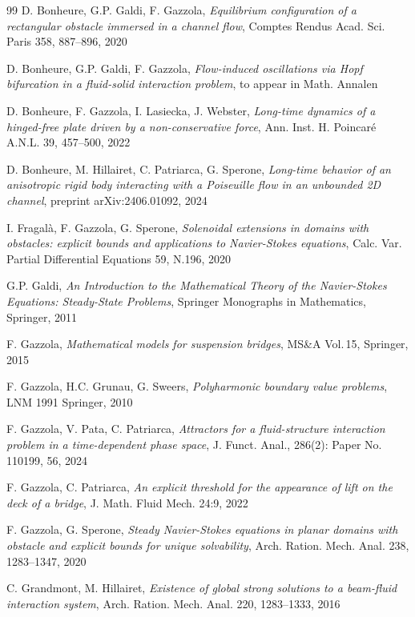 \documentclass[11pt,a4paper]{amsart}
\theoremstyle{remark}
\theoremstyle{definition}
\numberwithin{equation}{section}
\numberwithin{proposition}{section}
\begin{document}
{\begin{thebibliography}{99}
 D. Bonheure, G.P. Galdi, F. Gazzola, {\em Equilibrium configuration of a rectangular obstacle immersed in a channel flow}, Comptes Rendus Acad. Sci. Paris 358, 887--896, 2020

 D. Bonheure, G.P. Galdi, F. Gazzola, {\em Flow-induced oscillations via Hopf bifurcation in a fluid-solid interaction problem},
to appear in Math. Annalen

 D. Bonheure, F. Gazzola, I. Lasiecka, J. Webster, {\em Long-time dynamics of a hinged-free plate driven by a non-conservative force}, Ann. Inst. H. Poincar\'e A.N.L. 39, 457--500, 2022

 D. Bonheure, M. Hillairet, C. Patriarca, G. Sperone, {\em Long-time behavior of an anisotropic rigid body interacting with a Poiseuille flow in an unbounded 2D channel}, preprint arXiv:2406.01092, 2024



 I. Fragalà, F. Gazzola, G. Sperone, {\em Solenoidal extensions in domains with obstacles: explicit bounds and applications to {N}avier-{S}tokes equations}, Calc. Var. Partial Differential Equations 59, N.196, 2020

 G.P. Galdi, {\em An Introduction to the Mathematical Theory of the Navier-Stokes Equations: Steady-State Problems}, Springer Monographs in Mathematics, Springer, 2011

 F. Gazzola, {\em Mathematical models for suspension bridges}, MS\&A Vol.\,15, Springer, 2015

 F. Gazzola, H.C. Grunau, G. Sweers, {\em Polyharmonic boundary value problems}, LNM 1991 Springer, 2010

F. Gazzola, V. Pata, C. Patriarca, \textit{Attractors for a fluid-structure interaction problem in a time-dependent phase space}, J. Funct. Anal., 286(2): Paper No. 110199, 56, 2024

 F. Gazzola, C. Patriarca, {\em An explicit threshold for the appearance of lift on the deck of a bridge}, J. Math. Fluid Mech. 24:9, 2022

 F. Gazzola, G. Sperone, {\em Steady Navier-Stokes equations in planar domains with obstacle and explicit bounds for unique solvability}, Arch. Ration. Mech. Anal. 238, 1283--1347, 2020

 C. Grandmont, M. Hillairet, {\em Existence of global strong solutions to a beam-fluid interaction system},
Arch. Ration. Mech. Anal. 220, 1283–1333, 2016




\end{thebibliography}}
\end{document}
